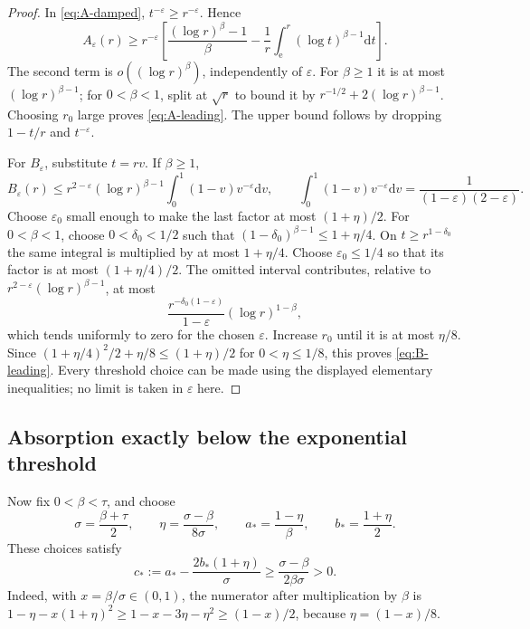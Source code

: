 \documentclass[11pt,a4paper]{article}
\numberwithin{equation}{section}
\theoremstyle{definition}
\theoremstyle{remark}\newtheorem{remark}[theorem]{Remark}
\newcommand{\ee}{\mathrm e}
\begin{document}
\begin{proof}
In \eqref{eq:A-damped}, \(t^{-\varepsilon}\geq r^{-\varepsilon}\).
Hence
\[
 A_\varepsilon(r)\geq r^{-\varepsilon}
 \left[\frac{(\log r)^\beta-1}{\beta}
       -\frac1r\int_\ee^r(\log t)^{\beta-1}\mathrm dt\right].
\]
The second term is \(o((\log r)^\beta)\), independently of
\(\varepsilon\). For \(\beta\geq1\) it is at most
\((\log r)^{\beta-1}\); for \(0<\beta<1\), split at \(\sqrt r\)
to bound it by \(r^{-1/2}+2(\log r)^{\beta-1}\).
Choosing \(r_0\) large proves \eqref{eq:A-leading}.
The upper bound follows by dropping \(1-t/r\) and \(t^{-\varepsilon}\).

For \(B_\varepsilon\), substitute \(t=rv\). If \(\beta\geq1\),
\[
 B_\varepsilon(r)\leq
 r^{2-\varepsilon}(\log r)^{\beta-1}
 \int_0^1(1-v)v^{-\varepsilon}\mathrm dv,
 \qquad
 \int_0^1(1-v)v^{-\varepsilon}\mathrm dv
 =\frac1{(1-\varepsilon)(2-\varepsilon)}.
\]
Choose \(\varepsilon_0\) small enough to make the last factor at most
\((1+\eta)/2\).
For \(0<\beta<1\), choose \(0<\delta_0<1/2\) such that
\((1-\delta_0)^{\beta-1}\leq1+\eta/4\).
On \(t\geq r^{1-\delta_0}\) the same integral is multiplied by at
most \(1+\eta/4\). Choose \(\varepsilon_0\leq1/4\) so that its
factor is at most \((1+\eta/4)/2\).
The omitted interval contributes, relative to
\(r^{2-\varepsilon}(\log r)^{\beta-1}\), at most
\[
 \frac{r^{-\delta_0(1-\varepsilon)}}{1-\varepsilon}
                     (\log r)^{1-\beta},
\]
which tends uniformly to zero for the chosen \(\varepsilon\).
Increase \(r_0\) until it is at most \(\eta/8\).
Since \((1+\eta/4)^2/2+\eta/8\leq(1+\eta)/2\) for
\(0<\eta\leq1/8\), this proves \eqref{eq:B-leading}.
Every threshold choice can be made using the displayed elementary
inequalities; no limit is taken in \(\varepsilon\) here.
\end{proof}

\subsection{Absorption exactly below the exponential threshold}

Now fix \(0<\beta<\tau\), and choose
\[
 \sigma=\frac{\beta+\tau}{2},\qquad
 \eta=\frac{\sigma-\beta}{8\sigma},\qquad
 a_*=\frac{1-\eta}{\beta},\qquad b_*=\frac{1+\eta}{2}.
\]
These choices satisfy
\begin{equation}\label{eq:absorption-margin}
 c_*:=a_*-\frac{2b_*(1+\eta)}{\sigma}
 \geq\frac{\sigma-\beta}{2\beta\sigma}>0.
\end{equation}
Indeed, with \(x=\beta/\sigma\in(0,1)\),
the numerator after multiplication by \(\beta\) is
\(1-\eta-x(1+\eta)^2\geq1-x-3\eta-\eta^2
\geq(1-x)/2\), because \(\eta=(1-x)/8\).
\end{document}
